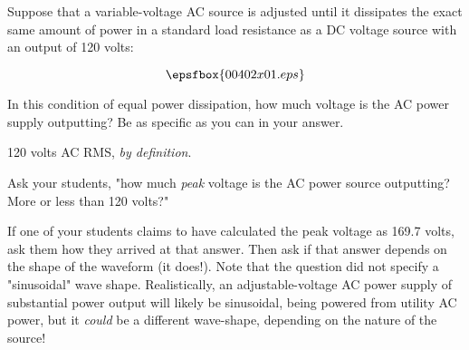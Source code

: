 

Suppose that a variable-voltage AC source is adjusted until it dissipates the exact same amount of power in a standard load resistance as a DC voltage source with an output of 120 volts:

$$\epsfbox{00402x01.eps}$$

In this condition of equal power dissipation, how much voltage is the AC power supply outputting?  Be as specific as you can in your answer.







120 volts AC RMS, {\it by definition}.







Ask your students, "how much {\it peak} voltage is the AC power source outputting?  More or less than 120 volts?"

If one of your students claims to have calculated the peak voltage as 169.7 volts, ask them how they arrived at that answer.  Then ask if that answer depends on the shape of the waveform (it does!).  Note that the question did not specify a "sinusoidal" wave shape.  Realistically, an adjustable-voltage AC power supply of substantial power output will likely be sinusoidal, being powered from utility AC power, but it {\it could} be a different wave-shape, depending on the nature of the source!




